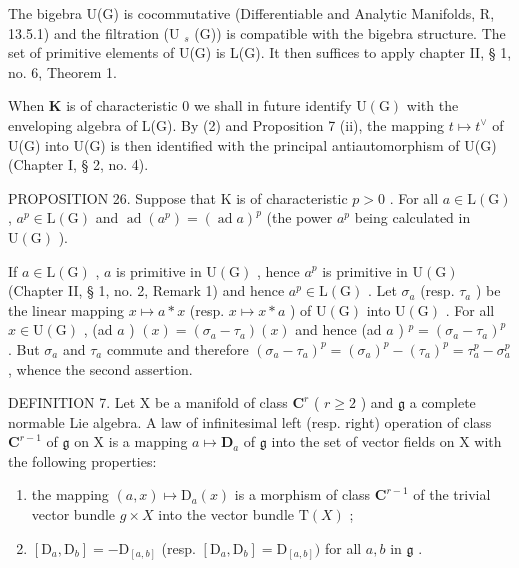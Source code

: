 The bigebra U(G) is cocommutative (Differentiable and Analytic Manifolds, R, 13.5.1) and the filtration (U \(_{s}\) (G)) is compatible with the bigebra structure. The set of primitive elements of U(G) is L(G). It then suffices to apply chapter II, § 1, no. 6, Theorem 1.

When \(\mathbf{K}\) is of characteristic 0 we shall in future identify \(\mathrm{U}(\mathrm{G})\) with the enveloping algebra of L(G). By (2) and Proposition 7 (ii), the mapping \(t \mapsto t^{\vee}\) of U(G) into U(G) is then identified with the principal antiautomorphism of U(G) (Chapter I, § 2, no. 4).

PROPOSITION 26. Suppose that K is of characteristic \(p > 0\) . For all \(a \in \mathrm{L}(\mathrm{G})\) , \(a^p \in \mathrm{L}(\mathrm{G})\) and \(\operatorname{ad}(a^p) = (\operatorname{ad} a)^p\) (the power \(a^p\) being calculated in \(\mathrm{U}(\mathrm{G})\) ).

If \(a \in \mathrm{L}(\mathrm{G})\) , \(a\) is primitive in \(\mathrm{U}(\mathrm{G})\) , hence \(a^p\) is primitive in \(\mathrm{U}(\mathrm{G})\) (Chapter II, § 1, no. 2, Remark 1) and hence \(a^p \in \mathrm{L}(\mathrm{G})\) . Let \(\sigma_a\) (resp. \(\tau_a\) ) be the linear mapping \(x \mapsto a * x\) (resp. \(x \mapsto x * a\) ) of \(\mathrm{U}(\mathrm{G})\) into \(\mathrm{U}(\mathrm{G})\) . For all \(x \in \mathrm{U}(\mathrm{G})\) , (ad \(a\) ) \((x) = (\sigma_a - \tau_a)(x)\) and hence (ad \(a\) ) \(^p = (\sigma_a - \tau_a)^p\) . But \(\sigma_a\) and \(\tau_a\) commute and therefore \((\sigma_a - \tau_a)^p = (\sigma_a)^p - (\tau_a)^p = \tau_a^p - \sigma_a^p\) , whence the second assertion.

DEFINITION 7. Let X be a manifold of class \(\mathbf{C}^r\) ( \(r \geqslant 2\) ) and \(\mathfrak{g}\) a complete normable Lie algebra. A law of infinitesimal left (resp. right) operation of class \(\mathbf{C}^{r-1}\) of \(\mathfrak{g}\) on X is a mapping \(a \mapsto \mathbf{D}_a\) of \(\mathfrak{g}\) into the set of vector fields on X with the following properties:

\begin{enumerate}
\def\labelenumi{(\alph{enumi})}
\item
  the mapping \((a, x) \mapsto \mathrm{D}_a(x)\) is a morphism of class \(\mathbf{C}^{r-1}\) of the trivial vector bundle \(g \times X\) into the vector bundle \(\mathrm{T}(X)\) ;
\item
  \([\mathrm{D}_a,\mathrm{D}_b] = -\mathrm{D}_{[a,b]}\) (resp. \([\mathrm{D}_a,\mathrm{D}_b] = \mathrm{D}_{[a,b]})\) for all \(a,b\) in \(\mathfrak{g}\) .
\end{enumerate}

